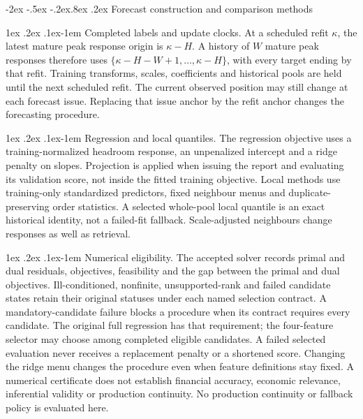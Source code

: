 \documentclass[10pt,a4paper]{article}
\makeatletter
\renewcommand\section{\@startsection{section}{1}{\z@}%
  {-2ex \@plus -.5ex \@minus -.2ex}{.8ex \@plus .2ex}%
  {\normalfont\large\bfseries}}
\renewcommand\paragraph{\@startsection{paragraph}{4}{\z@}%
  {1ex \@plus .2ex \@minus .1ex}{-1em}%
  {\normalfont\normalsize\bfseries}}
\makeatother
\begin{document}
\FloatBarrier


\section{Forecast construction and comparison methods}\label{sup:ar}\label{sup:rank}\label{sup:wp2}\label{sup:wp3}\label{sup:coherence}\label{sup:implementation}

\paragraph{Completed labels and update clocks.}
At a scheduled refit \(\kappa\), the latest mature peak response origin is
\(\kappa-H\). A history of \(W\) mature peak responses therefore uses
\(\{\kappa-H-W+1,\ldots,\kappa-H\}\), with every target ending by that refit.
Training transforms, scales, coefficients and historical pools are held until
the next scheduled refit. The current observed position may still change at
each forecast issue. Replacing that issue anchor by the refit anchor changes
the forecasting procedure.

\paragraph{Regression and local quantiles.}
The regression objective uses a training-normalized headroom response, an
unpenalized intercept and a ridge penalty on slopes. Projection is applied when
issuing the report and evaluating its validation score, not inside the fitted
training objective. Local methods use training-only standardized predictors,
fixed neighbour menus and duplicate-preserving order statistics. A selected
whole-pool local quantile is an exact historical identity, not a failed-fit
fallback. Scale-adjusted neighbours change responses as well as retrieval.

\paragraph{Numerical eligibility.}
The accepted solver records primal and dual residuals, objectives, feasibility and the gap between the primal and dual objectives. Ill-conditioned, nonfinite, unsupported-rank and failed candidate
states retain their original statuses under each named selection contract.
A mandatory-candidate failure blocks a procedure when its contract requires
every candidate. The original full regression has that requirement; the
four-feature selector may choose among completed eligible candidates. A failed
selected evaluation never receives a replacement penalty or a shortened score.
Changing the ridge menu changes the procedure even when feature definitions
stay fixed. A numerical certificate does not establish financial accuracy,
economic relevance, inferential validity or production continuity.
No production continuity or fallback policy is evaluated here.
\end{document}
